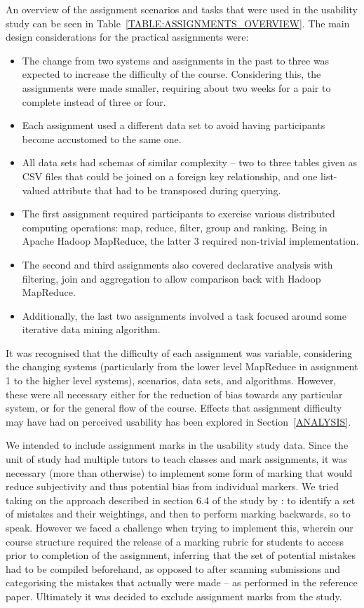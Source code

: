   An overview of the assignment scenarios and tasks that were used in the usability study can be seen in Table~\ref{TABLE:ASSIGNMENTS_OVERVIEW}. The main design considerations for the practical assignments were:

  \begin{itemize}
    \item The change from two systems and assignments in the past to three was expected to increase the difficulty of the course. Considering this, the assignments were made smaller, requiring about two weeks for a pair to complete instead of three or four.
    \item Each assignment used a different data set to avoid having participants become accustomed to the same one.
    \item All data sets had schemas of similar complexity -- two to three tables given as CSV files that could be joined on a foreign key relationship, and one list-valued attribute that had to be transposed during querying.
    \item The first assignment required participants to exercise various distributed computing operations: map, reduce, filter, group and ranking. Being in Apache Hadoop MapReduce, the latter 3 required non-trivial implementation.
    \item The second and third assignments also covered declarative analysis with filtering, join and aggregation to allow comparison back with Hadoop MapReduce.
    \item Additionally, the last two assignments involved a task focused around some iterative data mining algorithm.
  \end{itemize}
  
  It was recognised that the difficulty of each assignment was variable, considering the changing systems (particularly from the lower level MapReduce in assignment 1 to the higher level systems), scenarios, data sets, and algorithms. However, these were all necessary either for the reduction of bias towards any particular system, or for the general flow of the course. Effects that assignment difficulty may have had on perceived usability has been explored in Section~\ref{ANALYSIS}.

  We intended to include assignment marks in the usability study data. Since the unit of study had multiple tutors to teach classes and mark assignments, it was necessary (more than otherwise) to implement some form of marking that would reduce subjectivity and thus potential bias from individual markers. We tried taking on the approach described in section 6.4 of the study by \citeauthor{NANZ:CONCURRENCY_STUDY:2013} \cite{NANZ:CONCURRENCY_STUDY:2013}: to identify a set of mistakes and their weightings, and then to perform marking backwards, so to speak. However we faced a challenge when trying to implement this, wherein our course structure required the release of a marking rubric for students to access prior to completion of the assignment, inferring that the set of potential mistakes had to be compiled beforehand, as opposed to after scanning submissions and categorising the mistakes that actually were made -- as performed in the reference paper. Ultimately it was decided to exclude assignment marks from the study.


